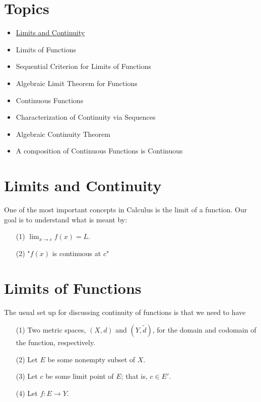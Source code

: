 \documentclass[a4paper]{article}
\begin{document}
\section{Topics}

\begin{itemize}
    \item {\hyperref[Limits and Continuity]{Limits and Continuity}} 
    \item Limits of Functions
    \item Sequential Criterion for Limits of Functions
    \item Algebraic Limit Theorem for Functions
    \item Continuous Functions
    \item Characterization of Continuity via Sequences
    \item Algebraic Continuity Theorem
    \item A composition of Continuous Functions is Continuous
\end{itemize}

\section{Limits and Continuity}\label{Limits and Continuity}

One of the most important concepts in Calculus is the limit of a function. Our goal is to understand what is meant by:
\begin{enumerate}
    \item[(1)] \( \lim_{ x \to c }  f(x) = L \).
    \item[(2)] "\( f(x) \) is continuous at \( c \)"
\end{enumerate}

\section{Limits of Functions}

The usual set up for discussing continuity of functions is that we need to have  
\begin{enumerate}
    \item[(1)] Two metric spaces, \( (X,d) \) and \( (Y, \tilde{d}) \), for the domain and codomain of the function, respectively.
    \item[(2)] Let \( E  \) be some nonempty subset of \( X  \).
    \item[(3)] Let \( c  \) be some limit point of \( E  \); that is, \( c \in E' \).
    \item[(4)] Let \( f: E \to Y \).
\end{enumerate}
\end{document}
